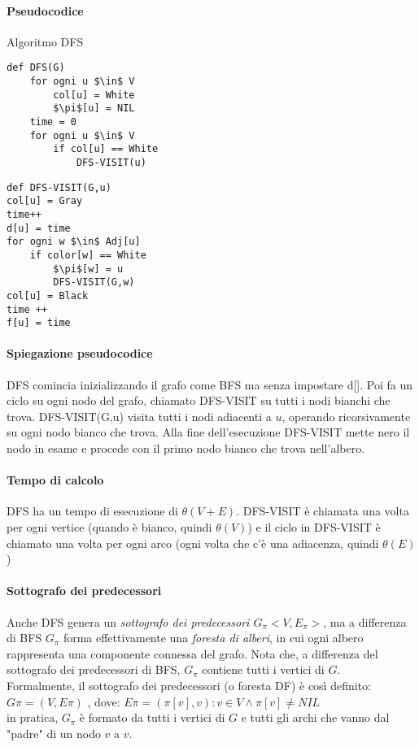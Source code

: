 \documentclass[12pt, a4paper, openany]{book}
\begin{document}
\paragraph{Pseudocodice} Algoritmo DFS
\begin{lstlisting}
def DFS(G)
    for ogni u $\in$ V
        col[u] = White
        $\pi$[u] = NIL
    time = 0
    for ogni u $\in$ V
        if col[u] == White
            DFS-VISIT(u)
\end{lstlisting}
	\begin{lstlisting}
def DFS-VISIT(G,u)
col[u] = Gray
time++
d[u] = time
for ogni w $\in$ Adj[u]
    if color[w] == White
        $\pi$[w] = u
        DFS-VISIT(G,w)
col[u] = Black
time ++
f[u] = time    
\end{lstlisting}

\paragraph{Spiegazione pseudocodice}
DFS comincia inizializzando il grafo come BFS ma senza impostare d[].
Poi fa un ciclo su ogni nodo del grafo, chiamato DFS-VISIT su tutti i nodi bianchi che trova.
DFS-VISIT(G,u) visita tutti i nodi adiacenti a $u$, operando ricorsivamente su ogni nodo bianco che trova.
Alla fine dell'esecuzione DFS-VISIT mette nero il nodo in esame e procede con il primo nodo bianco che trova nell'albero.
\paragraph*{Tempo di calcolo}
DFS ha un tempo di esecuzione di $\theta(V+E)$.
DFS-VISIT è chiamata una volta per ogni vertice (quando è bianco, quindi $\theta(V)$)
e il ciclo in DFS-VISIT è chiamato una volta per ogni arco (ogni volta che c'è una adiacenza, quindi $\theta(E)$)

\paragraph{Sottografo dei predecessori}
Anche DFS genera un \emph{sottografo dei predecessori $G_\pi<V,E_\pi>$}, ma a differenza di BFS
$G_\pi$ forma effettivamente una \emph{foresta di alberi}, in cui ogni albero rappresenta una componente connessa del grafo.
Nota che, a differenza del sottografo dei predecessori di BFS, $G_\pi$ contiene tutti i vertici di $G$.
\\Formalmente, il sottografo dei predecessori (o foresta DF) è così definito:
$G\pi = (V, E\pi )$ , dove:
$E\pi = {(\pi[v], v) : v \in V \land \pi[v] \neq NIL}$
\\in pratica, $G_\pi$ è formato da tutti i vertici di $G$ e tutti gli archi che vanno dal "padre" di un nodo $v$ a $v$.
\end{document}
